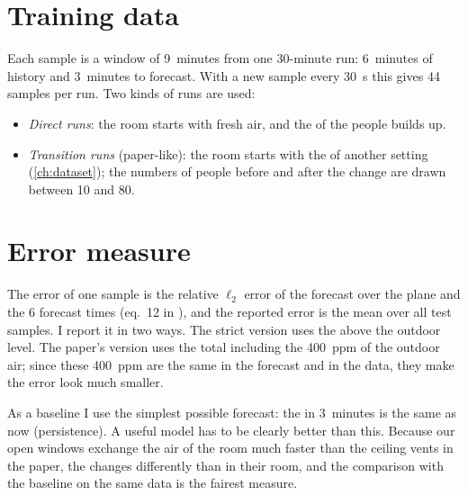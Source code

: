 \section{Training data}
Each sample is a window of 9~minutes from one 30-minute run: 6~minutes of history and 3~minutes to forecast.
With a new sample every 30~s this gives 44 samples per run. Two kinds of runs are used:
\begin{itemize}
  \item \emph{Direct runs}: the room starts with fresh air, and the \cotwo{} of the people builds up.
  \item \emph{Transition runs} (paper-like): the room starts with the \cotwo{} of another setting
        (\cref{ch:dataset}); the numbers of people before and after the change are drawn between 10 and 80.
\end{itemize}

\section{Error measure}
The error of one sample is the relative $\ell_2$ error of the forecast over the plane and the 6 forecast times
(eq.~12 in \citet{bian2025}), and the reported error is the mean over all test samples. I report it in two
ways. The strict version uses the \cotwo{} above the outdoor level. The paper's version uses the total \cotwo{}
including the 400~ppm of the outdoor air; since these 400~ppm are the same in the forecast and in the data, they
make the error look much smaller.

As a baseline I use the simplest possible forecast: the \cotwo{} in 3~minutes is the same as now
(persistence). A useful model has to be clearly better than this. Because our open windows exchange the air of
the room much faster than the ceiling vents in the paper, the \cotwo{} changes differently than in their room,
and the comparison with the baseline on the same data is the fairest measure.
